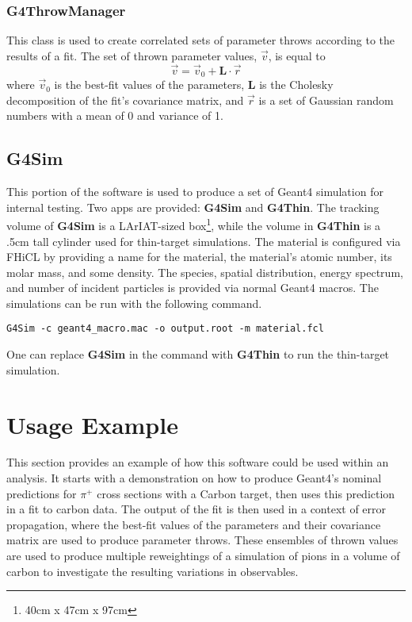 \documentclass[12pt]{article}
\begin{document}
\subsubsection{G4ThrowManager}
This class is used to create correlated sets of parameter throws according to the results of a fit. The set of thrown parameter values, $\overrightarrow{v}$, is equal to
\begin{equation}
\vec{v} = \vec{v}_0 + \textbf{L} \cdot \vec{r}
\end{equation}
where $\vec{v}_0$ is the best-fit values of the parameters, $\textbf{L}$ is the Cholesky decomposition of the fit's covariance matrix, and $\vec{r}$ is a set of Gaussian random numbers with a mean of 0 and variance of 1.
 
\subsection{G4Sim}
This portion of the software is used to produce a set of Geant4 simulation for internal testing. Two apps are provided: \textbf{G4Sim} and \textbf{G4Thin}. The tracking volume of \textbf{G4Sim} is a LArIAT-sized box\footnote{40cm x 47cm x 97cm}, while the volume in \textbf{G4Thin} is a .5cm tall cylinder used for thin-target simulations. The material is configured via FHiCL by providing a name for the material, the material's atomic number, its molar mass, and some density. The species, spatial distribution, energy spectrum, and number of incident particles is provided via normal Geant4 macros. The simulations can be run with the following command.

\begin{lstlisting}
G4Sim -c geant4_macro.mac -o output.root -m material.fcl
\end{lstlisting}
One can replace \textbf{G4Sim} in the command with \textbf{G4Thin} to run the thin-target simulation.

\section{Usage Example}
This section provides an example of how this software could be used within an analysis. It starts with a demonstration on how to produce Geant4's nominal predictions for $\pi^+$ cross sections with a Carbon target, then uses this prediction in a fit to carbon data. The output of the fit is then used in a context of error propagation, where the best-fit values of the parameters and their covariance matrix are used to produce parameter throws. These ensembles of thrown values are used to produce multiple reweightings of a simulation of pions in a volume of carbon to investigate the resulting variations in observables.
\end{document}
